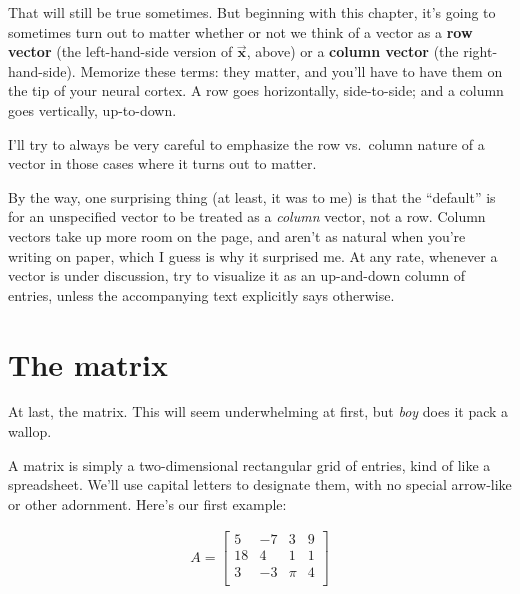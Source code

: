 
That will still be true sometimes. But beginning with this chapter, it's going
to sometimes turn out to matter whether or not we think of a vector as a
\textbf{row vector} (the left-hand-side version of
$\overrightarrow{\textbf{x}}$, above) or a \textbf{column vector} (the
right-hand-side). Memorize these terms: they matter, and you'll have to have
them on the tip of your neural cortex. A row goes horizontally, side-to-side;
and a column goes vertically, up-to-down.

I'll try to always be very careful to emphasize the row vs.~column nature of a
vector in those cases where it turns out to matter.


By the way, one surprising thing (at least, it was to me) is that the
``default'' is for an unspecified vector to be treated as a \textit{column}
vector, not a row. Column vectors take up more room on the page, and aren't as
natural when you're writing on paper, which I guess is why it surprised me. At
any rate, whenever a vector is under discussion, try to visualize it as an
up-and-down column of entries, unless the accompanying text explicitly says
otherwise.

\section{The matrix}


At last, the matrix. This will seem underwhelming at first, but \textit{boy}
does it pack a wallop.

A matrix is simply a two-dimensional rectangular grid of entries, kind of like
a spreadsheet. We'll use capital letters to designate them, with no special
arrow-like or other adornment. Here's our first example:

\vspace{-.15in}
\begin{align*}
A =
\begin{bmatrix}
5 &-7 &3 &9 \\
18 &4 &1 &1 \\
3 &-3 &\pi &4 \\
\end{bmatrix}
\end{align*}
\vspace{-.15in}

\label{dimension}

